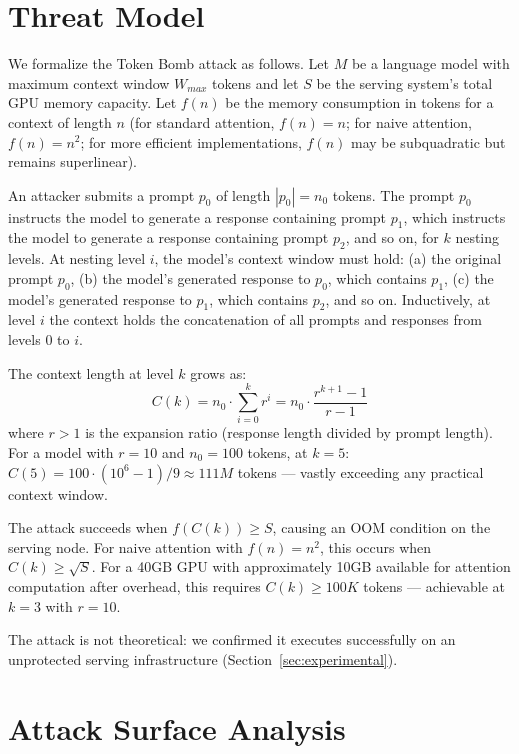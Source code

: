 \documentclass[12pt]{article}
\begin{document}
\section{Threat Model}
\label{sec:threat-model}

We formalize the Token Bomb attack as follows. Let $M$ be a language model with maximum context window $W_{max}$ tokens and let $S$ be the serving system's total GPU memory capacity. Let $f(n)$ be the memory consumption in tokens for a context of length $n$ (for standard attention, $f(n) = n$; for naive attention, $f(n) = n^2$; for more efficient implementations, $f(n)$ may be subquadratic but remains superlinear).

An attacker submits a prompt $p_0$ of length $|p_0| = n_0$ tokens. The prompt $p_0$ instructs the model to generate a response containing prompt $p_1$, which instructs the model to generate a response containing prompt $p_2$, and so on, for $k$ nesting levels. At nesting level $i$, the model's context window must hold: (a) the original prompt $p_0$, (b) the model's generated response to $p_0$, which contains $p_1$, (c) the model's generated response to $p_1$, which contains $p_2$, and so on. Inductively, at level $i$ the context holds the concatenation of all prompts and responses from levels $0$ to $i$.

The context length at level $k$ grows as:
\begin{equation}
C(k) = n_0 \cdot \sum_{i=0}^{k} r^i = n_0 \cdot \frac{r^{k+1} - 1}{r - 1}
\label{eq:context-growth}
\end{equation}
where $r > 1$ is the expansion ratio (response length divided by prompt length). For a model with $r = 10$ and $n_0 = 100$ tokens, at $k = 5$: $C(5) = 100 \cdot (10^6 - 1)/9 \approx 111M$ tokens — vastly exceeding any practical context window.

The attack succeeds when $f(C(k)) \geq S$, causing an OOM condition on the serving node. For naive attention with $f(n) = n^2$, this occurs when $C(k) \geq \sqrt{S}$. For a 40GB GPU with approximately 10GB available for attention computation after overhead, this requires $C(k) \geq 100K$ tokens — achievable at $k = 3$ with $r = 10$.

The attack is not theoretical: we confirmed it executes successfully on an unprotected serving infrastructure (Section~\ref{sec:experimental}).

\section{Attack Surface Analysis}
\label{sec:attack-surface}
\end{document}
